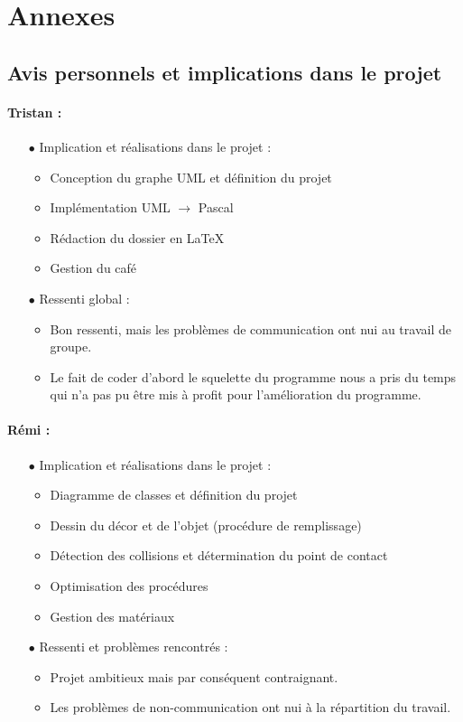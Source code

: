 \newpage
\section{Annexes}
\subsection{Avis personnels et implications dans le projet}
\paragraph{Tristan :}
\begin{itemize}

\item[$\bullet$]  Implication et réalisations dans le projet :
\begin{itemize}
\item Conception du graphe UML et définition du projet
\item Implémentation UML $\rightarrow$ Pascal
\item Rédaction du dossier en \LaTeX
\item Gestion du café
\end{itemize}
\item[$\bullet$] Ressenti global :
\begin{itemize}
\item Bon ressenti, mais les problèmes de communication ont nui au travail de groupe.
\item Le fait de coder d'abord le squelette du programme nous a pris du temps
qui n'a pas pu être mis à profit pour l'amélioration du programme.
\end{itemize}

\end{itemize}
\paragraph{Rémi :}
\begin{itemize}
\item[$\bullet$]  Implication et réalisations dans le projet :
\begin{itemize}
\item Diagramme de classes et définition du projet
\item Dessin du décor et de l'objet (procédure de remplissage)
\item Détection des collisions et détermination du point de contact
\item Optimisation des procédures
\item Gestion des matériaux 
\end{itemize}
\item[$\bullet$] Ressenti et problèmes rencontrés :
\begin{itemize}
\item Projet ambitieux mais par conséquent contraignant.
\item Les problèmes de non-communication ont nui à la répartition du travail.
\end{itemize}
\end{itemize}

